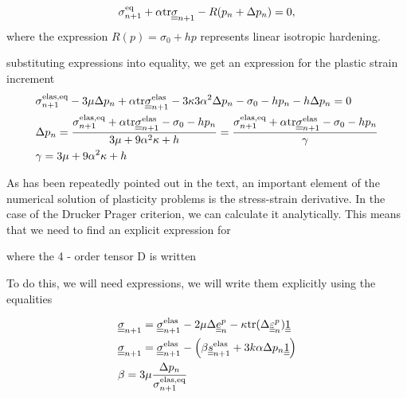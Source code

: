 \documentclass[12pt]{article}
\begin{document}
\begin{appendices}
    \begin{equation}
        \sigma_{n+1}^\text{eq} + \alpha \mathrm{tr} \underline{\underline{\sigma}}_{n+1} - R(p_n + \Delta p_n) = 0,
    \end{equation}
    where the expression $R(p) = \sigma_0 + h p $ represents linear isotropic hardening.

    substituting expressions into equality, we get an expression for the plastic strain increment
    \begin{align}
        & \sigma_{n+1}^\text{elas,eq} - 3\mu\Delta p_n + \alpha \mathrm{tr} \underline{\underline{\sigma}}_{n+1}^{\text{elas}} - 3\kappa 3\alpha^2 \Delta p_n - \sigma_0 - h p_n - h \Delta p_n = 0 \\
        & \Delta p_n = \frac{ \sigma_{n+1}^\text{elas,eq} + \alpha \mathrm{tr} \underline{\underline{\sigma}}_{n+1}^{\text{elas}} - \sigma_0 - h p_n}{ 3\mu + 9\alpha^2\kappa + h} = \frac{ \sigma_{n+1}^\text{elas,eq} + \alpha \mathrm{tr} \underline{\underline{\sigma}}_{n+1}^{\text{elas}} - \sigma_0 - h p_n}{ \gamma } \\
        & \gamma = 3\mu + 9\alpha^2\kappa + h
    \end{align}
    
    As has been repeatedly pointed out in the text, an important element of the numerical solution of plasticity problems is the stress-strain derivative. In the case of the Drucker Prager criterion, we can calculate it analytically. This means that we need to find an explicit expression for 
    
    where the 4 - order tensor D is written
    
    To do this, we will need expressions, we will write them explicitly using the equalities



    \begin{align}
        & \underline{\underline{\sigma}}_{n+1} = \underline{\underline{\sigma}}_{n+1}^\text{elas} - 2\mu \Delta \underline{\underline{e}}_{n}^p - \kappa \mathrm{tr} (\Delta \underline{\underline{\varepsilon}}_{n}^p) \underline{\underline{1}} \\
        & \underline{\underline{\sigma}}_{n+1} = \underline{\underline{\sigma}}_{n+1}^\text{elas} - \left( \beta \underline{\underline{s}}_{n+1}^\text{elas} + 3k\alpha \Delta p_n \underline{\underline{1}} \right) \\
        & \beta = 3\mu\frac{\Delta p_n}{\sigma_{n+1}^\text{elas,eq}} 
    \end{align}


\end{appendices}
\end{document}
